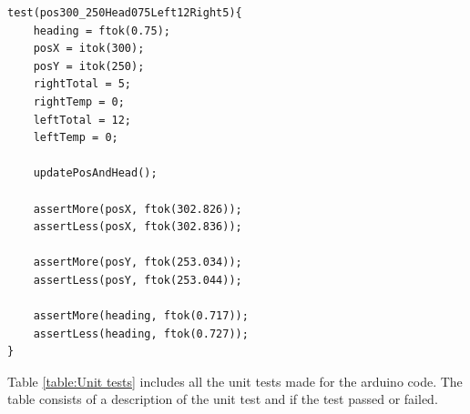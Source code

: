 \begin{lstlisting}[caption={Second type of Unit test}, label={ut2}]
test(pos300_250Head075Left12Right5){
	heading = ftok(0.75);
	posX = itok(300);
	posY = itok(250);
	rightTotal = 5;
	rightTemp = 0;
	leftTotal = 12;
	leftTemp = 0;

	updatePosAndHead();

	assertMore(posX, ftok(302.826));
	assertLess(posX, ftok(302.836)); 

	assertMore(posY, ftok(253.034));
	assertLess(posY, ftok(253.044));

	assertMore(heading, ftok(0.717));
	assertLess(heading, ftok(0.727));  
}
\end{lstlisting}

Table \ref{table:Unit tests} includes all the unit tests made for the arduino code. The table consists of a description of the unit test and if the test passed or failed. 
